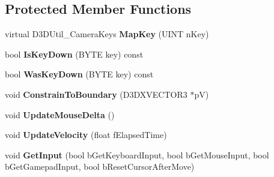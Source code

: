 \subsection*{Protected Member Functions}
\begin{DoxyCompactItemize}
\item 
\hypertarget{class_c_base_camera_afb3c6111e9b929ddc40b65dded48d17f}{virtual D3\+D\+Util\+\_\+\+Camera\+Keys {\bfseries Map\+Key} (U\+I\+N\+T n\+Key)}\label{class_c_base_camera_afb3c6111e9b929ddc40b65dded48d17f}

\item 
\hypertarget{class_c_base_camera_ac00770963442a7527b0fafe4a9ade260}{bool {\bfseries Is\+Key\+Down} (B\+Y\+T\+E key) const }\label{class_c_base_camera_ac00770963442a7527b0fafe4a9ade260}

\item 
\hypertarget{class_c_base_camera_ab4e5634db9c77f98b4f1f87b4de391dd}{bool {\bfseries Was\+Key\+Down} (B\+Y\+T\+E key) const }\label{class_c_base_camera_ab4e5634db9c77f98b4f1f87b4de391dd}

\item 
\hypertarget{class_c_base_camera_a1d888b7ae8d6c49ee564720bcaee2e95}{void {\bfseries Constrain\+To\+Boundary} (D3\+D\+X\+V\+E\+C\+T\+O\+R3 $\ast$p\+V)}\label{class_c_base_camera_a1d888b7ae8d6c49ee564720bcaee2e95}

\item 
\hypertarget{class_c_base_camera_a4c444a502868172538bdb36f5fe69bb6}{void {\bfseries Update\+Mouse\+Delta} ()}\label{class_c_base_camera_a4c444a502868172538bdb36f5fe69bb6}

\item 
\hypertarget{class_c_base_camera_afcca5c9bdc793eb6f1f8c0530b8b93f2}{void {\bfseries Update\+Velocity} (float f\+Elapsed\+Time)}\label{class_c_base_camera_afcca5c9bdc793eb6f1f8c0530b8b93f2}

\item 
\hypertarget{class_c_base_camera_ac0f6595e3bddfd13d620f5a38598192b}{void {\bfseries Get\+Input} (bool b\+Get\+Keyboard\+Input, bool b\+Get\+Mouse\+Input, bool b\+Get\+Gamepad\+Input, bool b\+Reset\+Cursor\+After\+Move)}\label{class_c_base_camera_ac0f6595e3bddfd13d620f5a38598192b}

\end{DoxyCompactItemize}
